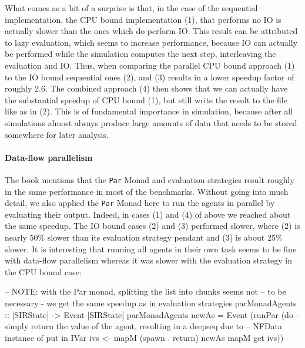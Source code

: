 What comes as a bit of a surprise is that, in the case of the sequential implementation, the CPU bound implementation (1), that performs no IO is actually slower than the ones which do perform IO. This result can be attributed to lazy evaluation, which seems to increase performance, because IO can actually be performed while the simulation computes the next step, interleaving the evaluation and IO. Thus, when comparing the parallel CPU bound approach (1) to the IO bound sequential ones (2), and (3) results in a lower speedup factor of roughly 2.6.
The combined approach (4) then shows that we can actually have the substantial speedup of CPU bound (1), but still write the result to the file like as in (2). This is of fundamental importance in simulation, because after all simulations almost always produce large amounts of data that needs to be stored somewhere for later analysis.

\paragraph{Data-flow parallelism} The book \cite{marlow_parallel_2013} mentions that the \texttt{Par} Monad and evaluation strategies result roughly in the same performance in most of the benchmarks. Without going into much detail, we also applied the \texttt{Par} Monad here to run the agents in parallel by evaluating their output. Indeed, in cases (1) and (4) of above we reached about the same speedup. The IO bound cases (2) and (3) performed slower, where (2) is nearly 50\% slower than its evaluation strategy pendant and (3) is about 25\% slower. It is interesting that running all agents in their own task seems to be fine with data-flow parallelism whereas it was slower with the evaluation strategy in the CPU bound case:

\begin{HaskellCode}
-- NOTE: with the Par monad, splitting the list into chunks seems not 
-- to be necessary - we get the same speedup as in evaluation strategies
parMonadAgents :: [SIRState] -> Event [SIRState]
parMonadAgents newAs = Event (runPar (do
  -- simply return the value of the agent, resulting in a deepseq due to
  -- NFData instance of put in IVar
  ivs <- mapM (spawn . return) newAs
  mapM get ivs))
\end{HaskellCode}

